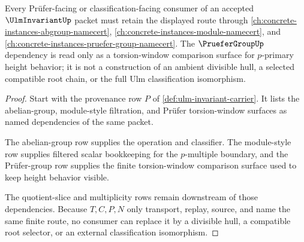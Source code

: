 \begin{theorem}
\label{thm:ulm-invariant-pruefer-dependency-route}
Every Prüfer-facing or classification-facing consumer of an accepted $\UlmInvariantUp$ packet must retain the displayed route through \autoref{ch:concrete-instances-abgroup-namecert}, \autoref{ch:concrete-instances-module-namecert}, and \autoref{ch:concrete-instances-pruefer-group-namecert}. The $\PrueferGroupUp$ dependency is read only as a torsion-window comparison surface for $p$-primary height behavior; it is not a construction of an ambient divisible hull, a selected compatible root chain, or the full Ulm classification isomorphism.
\end{theorem}
\begin{proof}
Start with the provenance row $P$ of \autoref{def:ulm-invariant-carrier}. It lists the abelian-group, module-style filtration, and Prüfer torsion-window surfaces as named dependencies of the same packet.

The abelian-group row supplies the operation and classifier. The module-style row supplies filtered scalar bookkeeping for the $p$-multiple boundary, and the Prüfer-group row supplies the finite torsion-window comparison surface used to keep height behavior visible.

The quotient-slice and multiplicity rows remain downstream of those dependencies. Because $T,C,P,N$ only transport, replay, source, and name the same finite route, no consumer can replace it by a divisible hull, a compatible root selector, or an external classification isomorphism.
\end{proof}

\begin{closurestatus}{\UlmInvariantUp}
  \theoryclosure{\seedClosure}
  \formalstatus{\unformalizedV}
\end{closurestatus}

